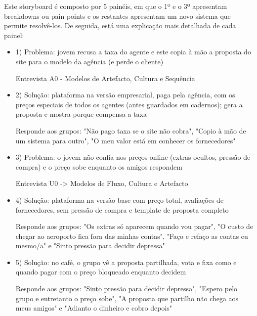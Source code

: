 Este storyboard é composto por 5 painéis, em que o 1º e o 3º apresentam breakdowns ou pain points e os restantes apresentam um novo sistema que permite resolvê-los.
De seguida, está uma explicação mais detalhada de cada painel:
\begin{itemize}
    \item 1) Problema: jovem recusa a taxa do agente e este copia à mão a proposta do site para o modelo da agência (e perde o cliente)
            
            Entrevista A0 - Modelos de Artefacto, Cultura e Sequência
    \item 2) Solução: plataforma na versão empresarial, paga pela agência, com os preços especiais de todos os agentes (antes guardados em cadernos); gera a proposta e mostra porque compensa a taxa
            
            Responde aos grupos: "Não pago taxa se o site não cobra", "Copio à mão de um sistema para outro", "O meu valor está em conhecer os fornecedores"
    \item 3) Problema: o jovem não confia nos preços online (extras ocultos, pressão de compra) e o preço sobe enquanto os amigos respondem
            
            Entrevista U0 -> Modelos de Fluxo, Cultura e Artefacto
    \item 4) Solução: plataforma na versão base com preço total, avaliações de fornecedores, sem pressão de compra e template de proposta completo
            
            Responde aos grupos: "Os extras só aparecem quando vou pagar", "O custo de chegar ao aeroporto fica fora das minhas contas", "Faço e refaço as contas eu mesmo/a" e "Sinto pressão para decidir depressa"
    \item 5) Solução: no café, o grupo vê a proposta partilhada, vota e fixa como e quando pagar com o preço bloqueado enquanto decidem
            
            Responde aos grupos: "Sinto pressão para decidir depressa", "Espero pelo grupo e entretanto o preço sobe", "A proposta que partilho não chega aos meus amigos" e "Adianto o dinheiro e cobro depois"
\end{itemize}


